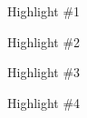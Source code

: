 \begin{highlights}

\item Highlight \#1

\item Highlight \#2

\item Highlight \#3

\item Highlight \#4

\end{highlights}
